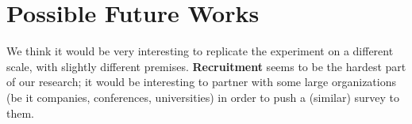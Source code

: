 \documentclass{sigchi}
\begin{document}
\section{Possible Future Works}
We think it would be very interesting to replicate the experiment on a different scale, with slightly different premises. \textbf{Recruitment} seems to be the hardest part of our research; it would be interesting to partner with some large organizations (be it companies, conferences, universities) in order to push a (similar) survey to them.\newline






\balance{}

\balance{}



\end{document}
